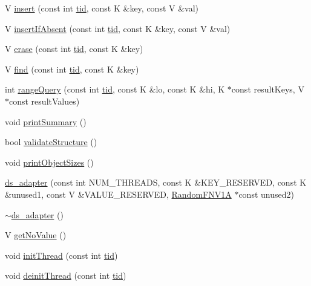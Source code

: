 \begin{DoxyCompactItemize}
\item 
V \hyperlink{classds__adapter_a6c0fc676d77e30e14946baf325174739}{insert} (const int \hyperlink{microbench_2main_8cpp_a9ca9869868fe7e7a38a921cc7de4103f}{tid}, const K \&key, const V \&val)
\item 
V \hyperlink{classds__adapter_ae9cb29ad0c0338c0e1d12ef97e008135}{insert\+If\+Absent} (const int \hyperlink{microbench_2main_8cpp_a9ca9869868fe7e7a38a921cc7de4103f}{tid}, const K \&key, const V \&val)
\item 
V \hyperlink{classds__adapter_a1bf459e8449df93cc738a644aeffdcfb}{erase} (const int \hyperlink{microbench_2main_8cpp_a9ca9869868fe7e7a38a921cc7de4103f}{tid}, const K \&key)
\item 
V \hyperlink{classds__adapter_a0109b0d011810f687c9e9273eb1d1bc8}{find} (const int \hyperlink{microbench_2main_8cpp_a9ca9869868fe7e7a38a921cc7de4103f}{tid}, const K \&key)
\item 
int \hyperlink{classds__adapter_a23a9c8db5425e98a93d647df1c6c23dd}{range\+Query} (const int \hyperlink{microbench_2main_8cpp_a9ca9869868fe7e7a38a921cc7de4103f}{tid}, const K \&lo, const K \&hi, K $\ast$const result\+Keys, V $\ast$const result\+Values)
\item 
void \hyperlink{classds__adapter_aac97293215557665d2ef1e1a0d06fcfd}{print\+Summary} ()
\item 
bool \hyperlink{classds__adapter_ae50fe8a8683c0278cdd4c45e1405860d}{validate\+Structure} ()
\item 
void \hyperlink{classds__adapter_a33b13b7059a8c0345fb59a324dc3a691}{print\+Object\+Sizes} ()
\item 
\hyperlink{classds__adapter_a8bd2274b39a6716d649cde5a8f313b40}{ds\+\_\+adapter} (const int N\+U\+M\+\_\+\+T\+H\+R\+E\+A\+DS, const K \&K\+E\+Y\+\_\+\+R\+E\+S\+E\+R\+V\+ED, const K \&unused1, const V \&V\+A\+L\+U\+E\+\_\+\+R\+E\+S\+E\+R\+V\+ED, \hyperlink{classRandomFNV1A}{Random\+F\+N\+V1A} $\ast$const unused2)
\item 
\hyperlink{classds__adapter_a366f46dd39d59f2d4a147589f5fd98e3}{$\sim$ds\+\_\+adapter} ()
\item 
V \hyperlink{classds__adapter_a9e1e4aec136b351d1a6820d70484a6c5}{get\+No\+Value} ()
\item 
void \hyperlink{classds__adapter_a3733f6a6b57312b1b5e4fb5181d82a0b}{init\+Thread} (const int \hyperlink{microbench_2main_8cpp_a9ca9869868fe7e7a38a921cc7de4103f}{tid})
\item 
void \hyperlink{classds__adapter_a173ca48b19fc1dc346159ea582c690cd}{deinit\+Thread} (const int \hyperlink{microbench_2main_8cpp_a9ca9869868fe7e7a38a921cc7de4103f}{tid})

\end{DoxyCompactItemize}

